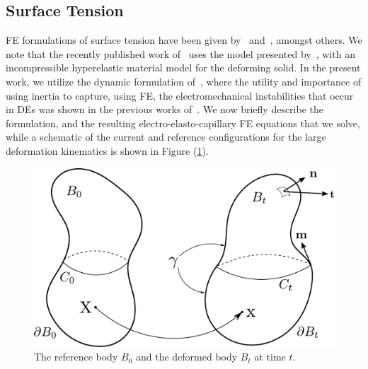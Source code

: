 \documentclass[8.5pt,twoside,twocolumn]{article}
\begin{document}
\subsection{Surface Tension}

FE formulations of surface tension have been given by~\citet{saksonoCM2006} and~\citet{javiliCMAME2010}, amongst others.  We note that the recently published work of~\citet{henannSM2014} uses the model presented by~\citet{saksonoCM2006}, with an incompressible hyperelastic material model for the deforming solid.  In the present work, we utilize the dynamic formulation of~\citet{saksonoCM2006a}, where the utility and importance of using inertia to capture, using FE, the electromechanical instabilities that occur in DEs was shown in the previous works of~\citet{parkIJSS2012,parkCMAME2013,parkSM2013}.  We now briefly describe the formulation, and the resulting electro-elasto-capillary FE equations that we solve, while a schematic of the current and reference configurations for the large deformation kinematics is shown in Figure (\ref{ref}).

\begin{figure} \begin{center}
\includegraphics[scale=0.44]{pics/refdef.pdf}
\caption{The reference body $B_0$ and the deformed body $B_t$ at time $t$.}
\label{ref} \end{center}
\end{figure}
\end{document}
